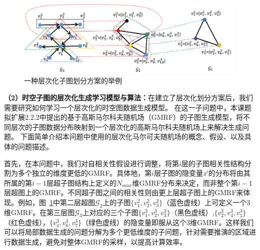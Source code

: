 \documentclass[12pt,UTF8,AutoFakeBold=2,a4paper]{ctexart} %
\begin{document}
\begin{figure}
\centering
\includegraphics[width=0.99\textwidth]{fig/paritition-2_new.png}    
\caption{{\kaishu 一种层次化子图划分方案的举例}}
\label{fig:part-2}
\end{figure}


\textbf{（2）时空子图的层次化生成学习模型与算法：}在建立了层次化划分方案后，我们需要研究如何学习一个层次化的时空图数据生成模型。%
在这一子问题中，本课题拟扩展2.2.2中提出的基于高斯马尔科夫随机场（GMRF）的子图生成模型，将不同层次的子图数据分布映射到一个层次化的高斯马尔科夫随机场上来解决生成问题。%
下面简单介绍本问题中使用的层次化马尔可夫随机场的概念、假设、以及具体的问题描述。

首先，在本问题中，我们对自相关性假设进行调整，将第$i$层的子图相关性结构分割为多个独立的维度更低的GMRF。具体地，第$i$层子图的隐变量$z^i$的分布将由其所属的第$i-1$层超子图结构上定义的$N_{max}$维GMRF分布来决定，而非整个第$i-1$层超图上的GMRF。不同超子图之间的相关性则由更上层超子图上的GMRF来体现。例如，图~\ref{fig:part-2}中第二层超图$\mathcal{G}_2$上的子图$\{v^2_1, v^2_2, v^2_3\}$（蓝色虚线）上可定义一个3维GMRF。在第三层图$\mathcal{G}_3$上对应的三个子图$\{v^3_1, v^3_2, v^3_3\}$（黑色虚线）,$\{v^3_2, v^3_4, v^3_5\}$（红色虚线），$\{v^3_4, v^3_6, v^3_7\}$（绿色虚线）的隐变量即服从这个3维GMRF。这样我们可以将局部数据生成的问题分解为多个更低维度的子问题，针对需要推演的区域进行数据生成，避免对整体GMRF的采样，以提高计算效率。
\end{document}
